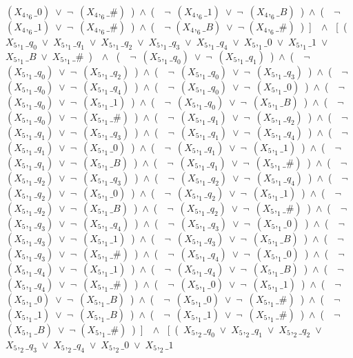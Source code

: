 ﻿\documentclass[a4paper,10pt]{article}
\begin{document}
$(X_4,_6\_0)$\ $\vee$\ $\neg$\ $(X_4,_6\_\#)$\ )\ $\wedge$\ (\ \ $\neg$\ $(X_4,_6\_1)$\ $\vee$\ $\neg$\ $(X_4,_6\_B)$\ )\ $\wedge$\ (\ \ $\neg$\ $(X_4,_6\_1)$\ $\vee$\ $\neg$\ $(X_4,_6\_\#)$\ )\ $\wedge$\ (\ \ $\neg$ $(X_4,_6\_B)$\ $\vee$\ $\neg$ $(X_4,_6\_\#)$\ )\ ]\ \ $\wedge$ \ [\ (\ $X_5,_1\_q_0$\ $\vee$\ $X_5,_1\_q_1$\ $\vee$\ $X_5,_1\_q_2$\ $\vee$\ $X_5,_1\_q_3$\ $\vee$\ $X_5,_1\_q_4$\ $\vee$\ $X_5,_1\_0$\ $\vee$\ $X_5,_1\_1$\ $\vee$\ $X_5,_1\_B$\ $\vee$\ $X_5,_1\_\#$\ )\ \ $\wedge$ \ (\ \ $\neg$\ $(X_5,_1\_q_0)$\ $\vee$\ $\neg$\ $(X_5,_1\_q_1)$\ )\ $\wedge$\ (\ \ $\neg$\ $(X_5,_1\_q_0)$\ $\vee$\ $\neg$\ $(X_5,_1\_q_2)$\ )\ $\wedge$\ (\ \ $\neg$\ $(X_5,_1\_q_0)$\ $\vee$\ $\neg$\ $(X_5,_1\_q_3)$\ )\ $\wedge$\ (\ \ $\neg$\ $(X_5,_1\_q_0)$\ $\vee$\ $\neg$\ $(X_5,_1\_q_4)$\ )\ $\wedge$\ (\ \ $\neg$\ $(X_5,_1\_q_0)$\ $\vee$\ $\neg$\ $(X_5,_1\_0)$\ )\ $\wedge$\ (\ \ $\neg$\ $(X_5,_1\_q_0)$\ $\vee$\ $\neg$\ $(X_5,_1\_1)$\ )\ $\wedge$\ (\ \ $\neg$\ $(X_5,_1\_q_0)$\ $\vee$\ $\neg$\ $(X_5,_1\_B)$\ )\ $\wedge$\ (\ \ $\neg$\ $(X_5,_1\_q_0)$\ $\vee$\ $\neg$\ $(X_5,_1\_\#)$\ )\ $\wedge$\ (\ \ $\neg$\ $(X_5,_1\_q_1)$\ $\vee$\ $\neg$\ $(X_5,_1\_q_2)$\ )\ $\wedge$\ (\ \ $\neg$\ $(X_5,_1\_q_1)$\ $\vee$\ $\neg$\ $(X_5,_1\_q_3)$\ )\ $\wedge$\ (\ \ $\neg$\ $(X_5,_1\_q_1)$\ $\vee$\ $\neg$\ $(X_5,_1\_q_4)$\ )\ $\wedge$\ (\ \ $\neg$\ $(X_5,_1\_q_1)$\ $\vee$\ $\neg$\ $(X_5,_1\_0)$\ )\ $\wedge$\ (\ \ $\neg$\ $(X_5,_1\_q_1)$\ $\vee$\ $\neg$\ $(X_5,_1\_1)$\ )\ $\wedge$\ (\ \ $\neg$\ $(X_5,_1\_q_1)$\ $\vee$\ $\neg$\ $(X_5,_1\_B)$\ )\ $\wedge$\ (\ \ $\neg$\ $(X_5,_1\_q_1)$\ $\vee$\ $\neg$\ $(X_5,_1\_\#)$\ )\ $\wedge$\ (\ \ $\neg$\ $(X_5,_1\_q_2)$\ $\vee$\ $\neg$\ $(X_5,_1\_q_3)$\ )\ $\wedge$\ (\ \ $\neg$\ $(X_5,_1\_q_2)$\ $\vee$\ $\neg$\ $(X_5,_1\_q_4)$\ )\ $\wedge$\ (\ \ $\neg$\ $(X_5,_1\_q_2)$\ $\vee$\ $\neg$\ $(X_5,_1\_0)$\ )\ $\wedge$\ (\ \ $\neg$\ $(X_5,_1\_q_2)$\ $\vee$\ $\neg$\ $(X_5,_1\_1)$\ )\ $\wedge$\ (\ \ $\neg$\ $(X_5,_1\_q_2)$\ $\vee$\ $\neg$\ $(X_5,_1\_B)$\ )\ $\wedge$\ (\ \ $\neg$\ $(X_5,_1\_q_2)$\ $\vee$\ $\neg$\ $(X_5,_1\_\#)$\ )\ $\wedge$\ (\ \ $\neg$\ $(X_5,_1\_q_3)$\ $\vee$\ $\neg$\ $(X_5,_1\_q_4)$\ )\ $\wedge$\ (\ \ $\neg$\ $(X_5,_1\_q_3)$\ $\vee$\ $\neg$\ $(X_5,_1\_0)$\ )\ $\wedge$\ (\ \ $\neg$\ $(X_5,_1\_q_3)$\ $\vee$\ $\neg$\ $(X_5,_1\_1)$\ )\ $\wedge$\ (\ \ $\neg$\ $(X_5,_1\_q_3)$\ $\vee$\ $\neg$\ $(X_5,_1\_B)$\ )\ $\wedge$\ (\ \ $\neg$\ $(X_5,_1\_q_3)$\ $\vee$\ $\neg$\ $(X_5,_1\_\#)$\ )\ $\wedge$\ (\ \ $\neg$\ $(X_5,_1\_q_4)$\ $\vee$\ $\neg$\ $(X_5,_1\_0)$\ )\ $\wedge$\ (\ \ $\neg$\ $(X_5,_1\_q_4)$\ $\vee$\ $\neg$\ $(X_5,_1\_1)$\ )\ $\wedge$\ (\ \ $\neg$\ $(X_5,_1\_q_4)$\ $\vee$\ $\neg$\ $(X_5,_1\_B)$\ )\ $\wedge$\ (\ \ $\neg$\ $(X_5,_1\_q_4)$\ $\vee$\ $\neg$\ $(X_5,_1\_\#)$\ )\ $\wedge$\ (\ \ $\neg$\ $(X_5,_1\_0)$\ $\vee$\ $\neg$\ $(X_5,_1\_1)$\ )\ $\wedge$\ (\ \ $\neg$\ $(X_5,_1\_0)$\ $\vee$\ $\neg$\ $(X_5,_1\_B)$\ )\ $\wedge$\ (\ \ $\neg$\ $(X_5,_1\_0)$\ $\vee$\ $\neg$\ $(X_5,_1\_\#)$\ )\ $\wedge$\ (\ \ $\neg$\ $(X_5,_1\_1)$\ $\vee$\ $\neg$\ $(X_5,_1\_B)$\ )\ $\wedge$\ (\ \ $\neg$\ $(X_5,_1\_1)$\ $\vee$\ $\neg$\ $(X_5,_1\_\#)$\ )\ $\wedge$\ (\ \ $\neg$ $(X_5,_1\_B)$\ $\vee$\ $\neg$ $(X_5,_1\_\#)$\ )\ ]\ \ $\wedge$ \ [\ (\ $X_5,_2\_q_0$\ $\vee$\ $X_5,_2\_q_1$\ $\vee$\ $X_5,_2\_q_2$\ $\vee$\ $X_5,_2\_q_3$\ $\vee$\ $X_5,_2\_q_4$\ $\vee$\ $X_5,_2\_0$\ $\vee$\ $X_5,_2\_1$\ 
\end{document}
